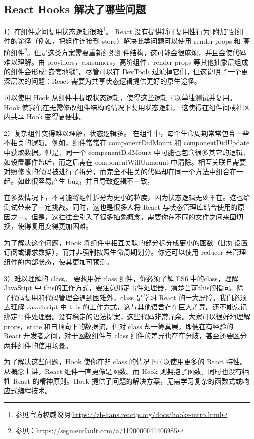 \documentclass[../../../interview-questions.tex]{subfiles}
\begin{document}
\subsection{React Hooks 解决了哪些问题}

1）在组件之间复用状态逻辑很难\footnote{参见官方权威说明:\url{https://zh-hans.reactjs.org/docs/hooks-intro.html}}。
React 没有提供将可复用性行为“附加”到组件的途径（例如，把组件连接到 store）解决此类问题可以使用 render props 和 高阶组件\footnote{参见：\url{https://segmentfault.com/a/1190000041406985}}。但是这类方案需要重新组织组件结构，这可能会很麻烦，并且会使代码难以理解。由 providers，consumers，高阶组件，render props 等其他抽象层组成的组件会形成“嵌套地狱”。尽管可以在 DevTools 过滤掉它们，但这说明了一个更深层次的问题：React 需要为共享状态逻辑提供更好的原生途径。

可以使用 Hook 从组件中提取状态逻辑，使得这些逻辑可以单独测试并复用。Hook 使我们在无需修改组件结构的情况下复用状态逻辑。 这使得在组件间或社区内共享 Hook 变得更便捷。

2）复杂组件变得难以理解，状态逻辑多。
在组件中，每个生命周期常常包含一些不相关的逻辑。例如，组件常常在 componentDidMount 和 componentDidUpdate 中获取数据。但是，同一个 componentDidMount 中可能也包含很多其它的逻辑，如设置事件监听，而之后需在 componentWillUnmount 中清除。相互关联且需要对照修改的代码被进行了拆分，而完全不相关的代码却在同一个方法中组合在一起。如此很容易产生 bug，并且导致逻辑不一致。

在多数情况下，不可能将组件拆分为更小的粒度，因为状态逻辑无处不在。这也给测试带来了一定挑战。同时，这也是很多人将 React 与状态管理库结合使用的原因之一。但是，这往往会引入了很多抽象概念，需要你在不同的文件之间来回切换，使得复用变得更加困难。

为了解决这个问题，Hook 将组件中相互关联的部分拆分成更小的函数（比如设置订阅或请求数据），而并非强制按照生命周期划分。你还可以使用 reducer 来管理组件的内部状态，使其更加可预测。

3）难以理解的 class。
要想用好 class 组件，你必须了解 ES6 中的class，理解 JavaSript 中 this的工作方式，要注意绑定事件处理器，清楚当前this的指向。除了代码复用和代码管理会遇到困难外，class 是学习 React 的一大屏障。我们必须去理解 JavaScript 中 this 的工作方式，这与其他语言存在巨大差异。还不能忘记绑定事件处理器。没有稳定的语法提案，这些代码非常冗余。大家可以很好地理解 props，state 和自顶向下的数据流，但对 class 却一筹莫展。即便在有经验的 React 开发者之间，对于函数组件与 class 组件的差异也存在分歧，甚至还要区分两种组件的使用场景。

为了解决这些问题，Hook 使你在非 class 的情况下可以使用更多的 React 特性。 从概念上讲，React 组件一直更像是函数。而 Hook 则拥抱了函数，同时也没有牺牲 React 的精神原则。Hook 提供了问题的解决方案，无需学习复杂的函数式或响应式编程技术。
\end{document}
